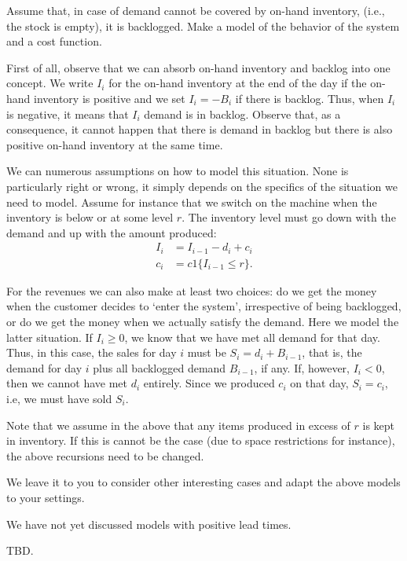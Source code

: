 \begin{question}
  Assume that, in case of demand cannot be covered by on-hand
  inventory, (i.e., the stock is empty), it is backlogged. Make a
  model of the behavior of the system and a cost function.
  \begin{solution}
    First of all, observe that we can absorb on-hand inventory and
    backlog into one concept. We write $I_i$ for the on-hand inventory
    at the end of the day if the on-hand inventory is positive and we
    set $I_i=-B_i$ if there is backlog. Thus, when $I_i$ is negative,
    it means that $I_i$ demand is in backlog.  Observe that, as a
    consequence, it cannot happen that there is demand in backlog but
    there is also positive on-hand inventory at the same time.

    We can numerous assumptions on how to model this situation. None
    is particularly right or wrong, it simply depends on the specifics
    of the situation we need to model. Assume for instance that we
    switch on the machine when the inventory is below or at some level
    $r$. The inventory level must go down with the demand and up with
    the amount produced:
    \begin{align*}
      I_i &= I_{i-1}-d_i + c_i \\
c_i &= c 1\{I_{i-1} \leq r\}.
    \end{align*}

    For the revenues we can also make at least two choices: do we get
    the money when the customer decides to `enter the system',
    irrespective of being backlogged, or do we get the money when we
    actually satisfy the demand. Here we model the latter situation.
    If $I_i\geq 0$, we know that we have met all demand for that
    day. Thus, in this case, the sales for day $i$ must be
    $S_i = d_i+B_{i-1}$, that is, the demand for day $i$ plus all
    backlogged demand $B_{i-1}$, if any. If, however, $I_i <0$, then
    we cannot have met $d_i$ entirely. Since we produced $c_i$ on that
    day, $S_i = c_i$, i.e, we must have sold $S_i$. 

    Note that we assume in the above that any items produced in excess
    of $r$ is kept in inventory. If this is cannot be the case (due to
    space restrictions for instance), the above recursions need to be
    changed.

    We leave it to you to consider other interesting cases and adapt
    the above models to your settings.

  \end{solution}
\end{question}


\begin{question}
  We have not yet discussed models with positive lead times. 
  \begin{solution}
    TBD.
  \end{solution}
\end{question}


